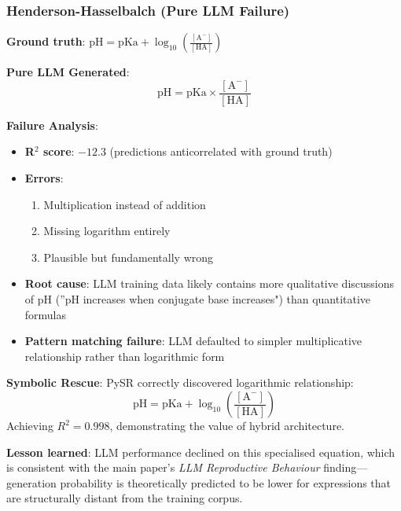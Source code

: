 \documentclass[twoside,11pt]{article}
\begin{document}
\subsubsection{Henderson-Hasselbalch (Pure LLM Failure)}

\begin{example}
\textbf{Ground truth}: $\text{pH} = \text{pKa} + \log_{10}\left(\frac{[\text{A}^-]}{[\text{HA}]}\right)$

\textbf{Pure LLM Generated}:
\begin{equation}
\text{pH} = \text{pKa} \times \frac{[\text{A}^-]}{[\text{HA}]}
\end{equation}

\textbf{Failure Analysis}:
\begin{itemize}
\item \textbf{R$^{2}$ score}: $-12.3$ (predictions anticorrelated with ground truth)
\item \textbf{Errors}: 
  \begin{enumerate}
  \item Multiplication instead of addition
  \item Missing logarithm entirely
  \item Plausible but fundamentally wrong
  \end{enumerate}
\item \textbf{Root cause}: LLM training data likely contains more qualitative discussions of pH (''pH increases when conjugate base increases") than quantitative formulas
\item \textbf{Pattern matching failure}: LLM defaulted to simpler multiplicative relationship rather than logarithmic form
\end{itemize}

\textbf{Symbolic Rescue}:
PySR correctly discovered logarithmic relationship:
\begin{equation}
\text{pH} = \text{pKa} + \log_{10}\left(\frac{[\text{A}^-]}{[\text{HA}]}\right)
\end{equation}
Achieving $R^2 = 0.998$, demonstrating the value of hybrid architecture.

\textbf{Lesson learned}: LLM performance declined on this specialised equation, which is consistent with the main paper's \emph{LLM Reproductive Behaviour} finding---generation probability is theoretically predicted to be lower for expressions that are structurally distant from the training corpus\citep{kambhampati2024llms}.
\end{example}
\end{document}
